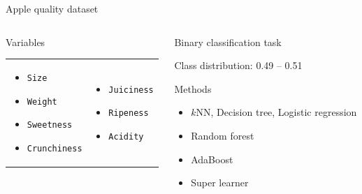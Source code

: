 

\begin{frame}{Apple quality dataset}

\begin{columns}[T]
\begin{column}{0.5\textwidth}
Variables

\begingroup\setlength{\tabcolsep}{-0.5ex}
\hspace*{-0.5em}\begin{tabular}{p{}p{}}
\begin{itemize}
	\item \texttt{Size}
	\item \texttt{Weight}
	\item \texttt{Sweetness}
	\item \texttt{Crunchiness}
\end{itemize}
&
\begin{itemize}
	\item \texttt{Juiciness}
	\item \texttt{Ripeness}
	\item \texttt{Acidity}
\end{itemize}
\end{tabular}
\endgroup

\end{column}
\begin{column}{0.5\textwidth}
\alert{Binary classification} task%

Class distribution: 0.49 -- 0.51

\vspace{1em}Methods
\begin{itemize}
	\item $k\text{NN}$, Decision tree, Logistic regression
	\item Random forest
	\item AdaBoost
	\item Super learner
\end{itemize}
\end{column}
\end{columns}

\end{frame}



